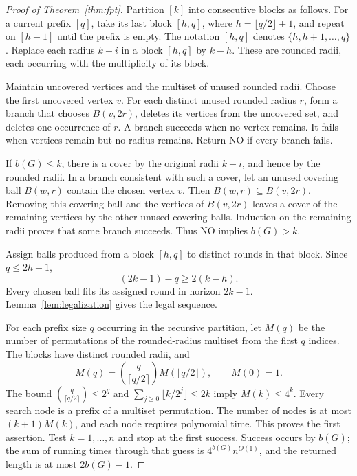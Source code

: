 \documentclass[11pt]{article}
\numberwithin{equation}{section}
\theoremstyle{definition}
\begin{document}
\begin{proof}[Proof of Theorem~\ref{thm:fpt}]
Partition $[k]$ into consecutive blocks as follows. For a current prefix
$[q]$, take its last block
$[h,q]$, where $h=\lfloor q/2\rfloor+1$, and repeat on $[h-1]$ until
the prefix is empty. The notation $[h,q]$ denotes
$\{h,h+1,\ldots,q\}$. Replace each radius $k-i$ in a block $[h,q]$ by
$k-h$. These are rounded radii, each occurring with the multiplicity of
its block.

Maintain uncovered vertices and the multiset of unused rounded radii.
Choose the first uncovered vertex $v$. For each distinct unused rounded
radius $r$, form a branch that chooses $B(v,2r)$, deletes its vertices
from the uncovered set, and deletes one occurrence of $r$. A branch
succeeds when no vertex remains. It fails when vertices remain but no
radius remains. Return \textnormal{NO} if every branch fails.

If $b(G)\le k$, there is a cover by the original radii $k-i$, and hence
by the rounded radii. In a branch consistent with such a cover, let an
unused covering ball $B(w,r)$ contain the chosen vertex $v$. Then
$B(w,r)\subseteq B(v,2r)$. Removing this covering ball and the vertices
of $B(v,2r)$ leaves a cover of the remaining vertices by the other unused
covering balls. Induction on the remaining radii proves that some branch
succeeds. Thus \textnormal{NO} implies $b(G)>k$.

Assign balls produced from a block $[h,q]$ to distinct rounds in that
block. Since $q\le2h-1$,
\[
 (2k-1)-q\ge2(k-h).
\]
Every chosen ball fits its assigned round in horizon $2k-1$.
Lemma~\ref{lem:legalization} gives the legal sequence.

For each prefix size $q$ occurring in the recursive partition, let $M(q)$
be the number of permutations of the rounded-radius multiset from the
first $q$ indices. The blocks have distinct rounded radii, and
\[
 M(q)=\binom{q}{\lceil q/2\rceil}M(\lfloor q/2\rfloor),
 \qquad M(0)=1.
\]
The bound $\binom{q}{\lceil q/2\rceil}\le2^q$ and
$\sum_{j\ge0}\lfloor k/2^j\rfloor\le2k$ imply $M(k)\le4^k$.
Every search node is a prefix of a multiset permutation. The number of
nodes is at most $(k+1)M(k)$, and each node requires polynomial time.
This proves the first assertion. Test $k=1,\ldots,n$ and stop at the
first success. Success occurs by $b(G)$; the sum of running times through
that guess is $4^{b(G)}n^{O(1)}$, and the returned length is at most
$2b(G)-1$.
\end{proof}
\end{document}
